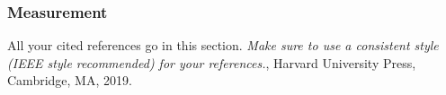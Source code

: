 \documentclass[11pt, oneside]{article}   	%
\begin{document}
\subsubsection{Measurement}

\clearpage
\begin{thebibliography}{99}  %
 
All your cited references go in this section. \textit{Make sure to use a consistent style (IEEE style recommended) for your references.}, Harvard University Press, Cambridge, MA, 2019.

\end{thebibliography}

% 
% 
\end{document}
